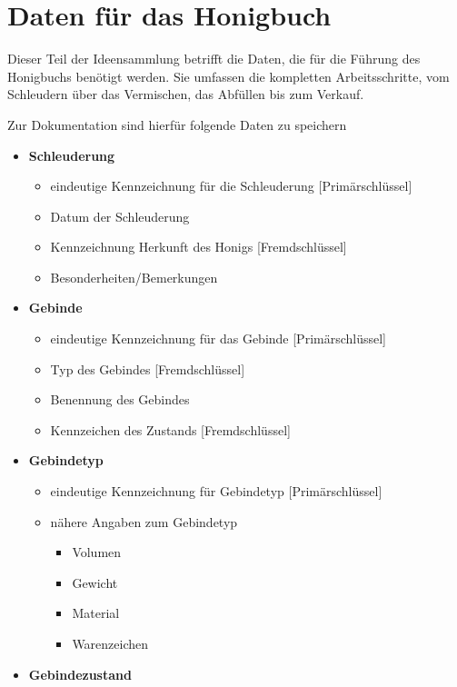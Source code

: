 \section{Daten für das Honigbuch}
Dieser Teil der Ideensammlung betrifft die Daten, die für die Führung des
Honigbuchs benötigt werden. Sie umfassen die kompletten Arbeitsschritte, vom
Schleudern über das Vermischen, das Abfüllen bis zum Verkauf.


Zur Dokumentation sind hierfür folgende Daten zu speichern
\begin{itemize}
  \item \label{DBschl}  \textbf{Schleuderung}
  \begin{itemize}
\item eindeutige Kennzeichnung für die Schleuderung [Primärschlüssel]    \item Datum der Schleuderung
    \item Kennzeichnung Herkunft des Honigs [Fremdschlüssel]
    \item Besonderheiten/Bemerkungen
  \end{itemize}
  \item \textbf{Gebinde}\label{DBgeb}
  \begin{itemize}
    \item eindeutige Kennzeichnung für das Gebinde [Primärschlüssel]
    \item Typ des Gebindes [Fremdschlüssel]
    \item Benennung des Gebindes
    \item Kennzeichen des Zustands [Fremdschlüssel]
  \end{itemize}
  \item \textbf{Gebindetyp}\label{DBgebt}
  \begin{itemize}
    \item eindeutige Kennzeichnung für Gebindetyp [Primärschlüssel]
    \item nähere Angaben zum Gebindetyp
    \begin{itemize}
      \item Volumen
      \item Gewicht
      \item Material
      \item Warenzeichen
    \end{itemize}
  \end{itemize}
  \item \textbf{Gebindezustand}\label{DBgebz}
  \begin{itemize}

\end{itemize}
\end{itemize}
